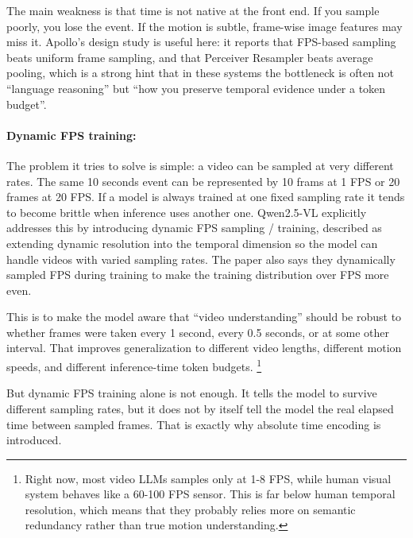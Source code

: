 \documentclass[11pt]{article}  %
\begin{document}
The main weakness is that time is not native at the front end. If you sample poorly, you lose the event. If the motion is subtle, frame-wise image features may miss it. Apollo's design study is useful here: it reports that FPS-based sampling beats uniform frame sampling, and that Perceiver Resampler beats average pooling, which is a strong hint that in these systems the bottleneck is often not ``language reasoning'' but ``how you preserve temporal evidence under a token budget''.

\paragraph{Dynamic FPS training:} 
The problem it tries to solve is simple: a video can be sampled at very different rates.
The same 10 seconds event can be represented by 10 frams at 1 FPS or 20 frames at 20 FPS.
If a model is always trained at one fixed sampling rate it tends to become brittle when inference uses another one.
Qwen2.5-VL explicitly addresses this by introducing dynamic FPS sampling / training, described as extending dynamic resolution into the temporal dimension so the model can handle videos with varied sampling rates.
The paper also says they dynamically sampled FPS during training to make the training distribution over FPS more even.

This is to make the model aware that ``video understanding'' should be robust to whether frames were taken every 1 second, every 0.5 seconds, or at some other interval. That improves generalization to different video lengths, different motion speeds, and different inference-time token budgets. \footnote{Right now, most video LLMs samples only at 1-8 FPS, while human visual system behaves like a 60-100 FPS sensor. This is far below human temporal resolution, which means that they probably relies more on semantic redundancy rather than true motion understanding.}

But dynamic FPS training alone is not enough.
It tells the model to survive different sampling rates, but it does not by itself tell the model the real elapsed time between sampled frames.
That is exactly why absolute time encoding is introduced.
\end{document}
